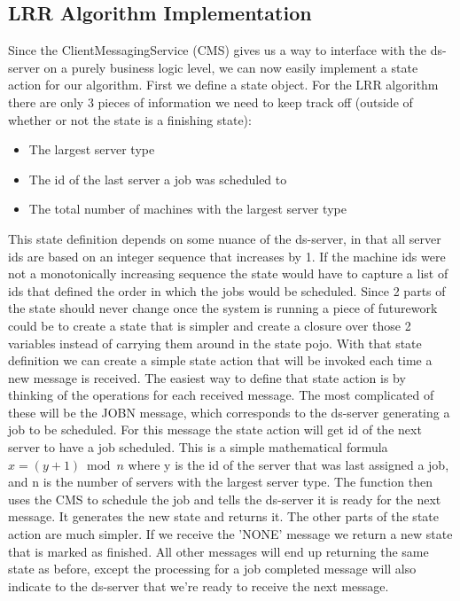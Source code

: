 \documentclass[12pt, letterpaper]{article}
\begin{document}
\subsection*{LRR Algorithm Implementation}
Since the ClientMessagingService (CMS) gives us a way to interface with the ds-server on a purely business logic level, we can now easily implement a state action for our algorithm.
First we define a state object. For the LRR algorithm there are only 3 pieces of information we need to keep track off (outside of whether or not the state is a finishing state):
\begin{itemize}
    \item The largest server type
    \item The id of the last server a job was scheduled to
    \item The total number of machines with the largest server type
\end{itemize}
This state definition depends on some nuance of the ds-server, in that all server ids are based on an integer sequence that increases by 1. 
If the machine ids were not a monotonically increasing sequence the state would have to capture a list of ids that defined the order in which the jobs would be scheduled.
Since 2 parts of the state should never change once the system is running a piece of futurework could be to create a state that is simpler and create a closure over those 2 variables instead of carrying them around in the state pojo.
\newline
With that state definition we can create a simple state action that will be invoked each time a new message is received. 
The easiest way to define that state action is by thinking of the operations for each received message. The most complicated of these will be the JOBN message, which corresponds to the ds-server generating a job to be scheduled.
For this message the state action will get id of the next server to have a job scheduled. This is a simple mathematical formula 
\begin{math}
    x = (y + 1) \bmod n
\end{math}
where y is the id of the server that was last assigned a job, and n is the number of servers with the largest server type.
The function then uses the CMS to schedule the job and tells the ds-server it is ready for the next message.
It generates the new state and returns it.
\newline
The other parts of the state action are much simpler. If we receive the 'NONE' message we return a new state that is marked as finished.
All other messages will end up returning the same state as before, except the processing for a job completed message will also indicate to the ds-server that we're ready to receive the next message.


\end{document}
